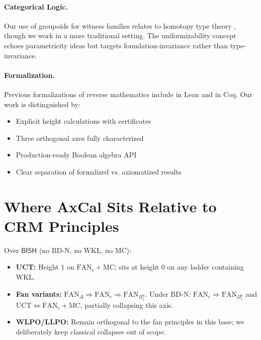 \documentclass[11pt]{article}
\theoremstyle{plain}
\theoremstyle{definition}
\newcommand{\UCT}{\mathrm{UCT}}
\newcommand{\BISH}{\mathsf{BISH}}
\newcommand{\BDN}{\mathrm{BD\mbox{-}N}}
\newcommand{\MC}{\mathrm{MC}}            %
\newcommand{\WKL}{\mathrm{WKL}}
\newcommand{\FTc}{\mathrm{FAN}_{\mathrm{c}}}  %
\newcommand{\FANPiO}{\mathrm{FAN}_{\Pi^0_1}}
\newcommand{\FANDelta}{\mathrm{FAN}_{\Delta}}
\begin{document}
\paragraph{Categorical Logic.} Our use of groupoids for witness families relates to homotopy type theory \cite{HoTTBook}, though we work in a more traditional setting. The uniformizability concept echoes parametricity ideas but targets foundation-invariance rather than type-invariance.

\paragraph{Formalization.} Previous formalizations of reverse mathematics include \cite{LeanRM2023} in Lean and \cite{CoqRM2022} in Coq. Our work is distinguished by:
\begin{itemize}
\item Explicit height calculations with certificates
\item Three orthogonal axes fully characterized
\item Production-ready Boolean algebra API
\item Clear separation of formalized vs. axiomatized results
\end{itemize}

\section{Where AxCal Sits Relative to CRM Principles}\label{app:zoo-map}

Over \(\BISH\) (no \(\BDN\), no \(\WKL\), no \(\MC\)):

\begin{itemize}
\item \textbf{UCT:} Height \(1\) on \(\FTc+\MC\); sits at height \(0\) on any ladder containing \(\WKL\).
\item \textbf{Fan variants:} \(\FANDelta \Rightarrow \FTc \Rightarrow \FANPiO\). Under \(\BDN\): \(\FTc \Rightarrow \FANPiO\) and \(\UCT \iff \FTc+\MC\), partially collapsing this axis.
\item \textbf{WLPO/LLPO:} Remain orthogonal to the fan principles in this base; we deliberately keep classical collapses out of scope.
\end{itemize}

\end{document}
